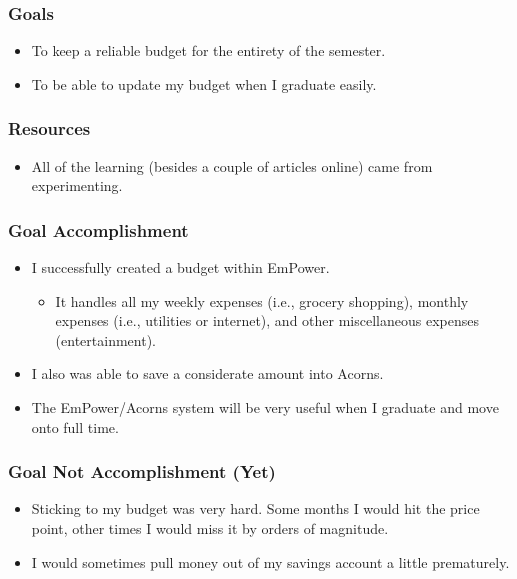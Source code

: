 \documentclass[xclolor=dvipsnames]{beamer}            %
\begin{document}
\begin{darkframes}
    \begin{frame}
        \frametitle{Goals}

        \begin{itemize}
            \item To keep a reliable budget for the entirety of the semester.
            \item To be able to update my budget when I graduate easily.
        \end{itemize}
    \end{frame}

    \begin{frame}
        \frametitle{Resources}

        \begin{itemize}
            \item All of the learning (besides a couple of articles online) came from experimenting.
        \end{itemize}
    \end{frame}

    \begin{frame}
        \frametitle{Goal Accomplishment}

        \begin{itemize}
            \item I successfully created a budget within EmPower.

                \begin{itemize}
                    \item It handles all my weekly expenses (i.e., grocery shopping), monthly expenses (i.e., utilities or internet), and other miscellaneous expenses (entertainment).
                \end{itemize}

            \item I also was able to save a considerate amount into Acorns.

            \item The EmPower/Acorns system will be very useful when I graduate and move onto full time.
        \end{itemize}
    \end{frame}

    \begin{frame}
        \frametitle{Goal Not Accomplishment (Yet)}

        \begin{itemize}
            \item Sticking to my budget was very hard. Some months I would hit the price point, other times I would miss it by orders of magnitude.
            \item I would sometimes pull money out of my savings account a little prematurely.
        \end{itemize}
    \end{frame}



\end{darkframes}
\end{document}
